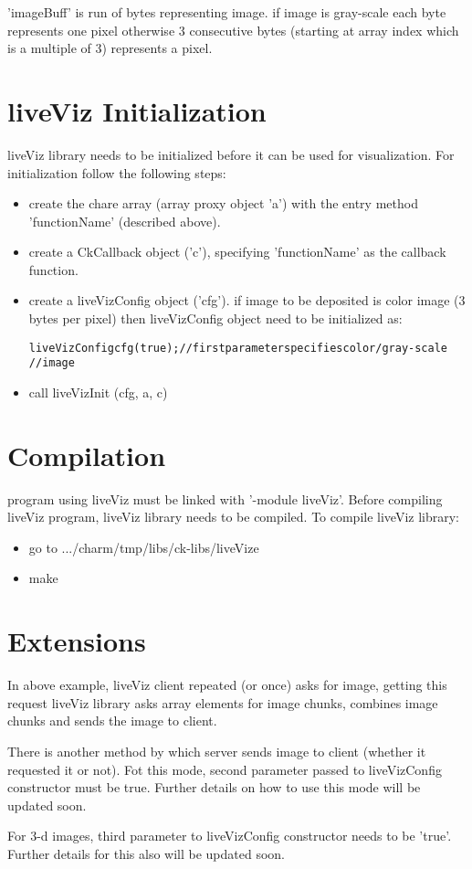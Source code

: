 'imageBuff' is run of bytes representing image. if image is gray-scale each
 byte represents one pixel otherwise 3 consecutive bytes (starting at 
array index which is a multiple of 3) represents a pixel.

\section{liveViz Initialization}

liveViz library needs to be initialized before it can be used for 
visualization. For initialization follow the following steps:
\begin{itemize}
\item create the chare array (array proxy object 'a') with the entry 
      method 'functionName' (described above).
\item create a CkCallback object ('c'), specifying 'functionName' as the 
      callback function.
\item create a liveVizConfig object ('cfg'). if image to be deposited is color 
      image (3 bytes per pixel) then liveVizConfig object need to be initialized
      as:
\begin{alltt}
          liveVizConfig cfg (true);// first parameter specifies color/gray-scale
                                   // image
\end{alltt}

\item call liveVizInit (cfg, a, c)
\end{itemize}

\section{Compilation}

\charmpp{} program using liveViz must be linked with '-module liveViz'. Before
compiling liveViz program, liveViz library needs to be compiled. To compile
liveViz library:
\begin{itemize}
\item go to .../charm/tmp/libs/ck-libs/liveVize
\item make
\end{itemize}

\section{Extensions}

In above example, liveViz client repeated (or once) asks for image, getting
this request liveViz library asks array elements for image chunks, combines
image chunks and sends the image to client.

There is another method by which server sends image to client (whether it
requested it or not). Fot this mode, second parameter passed to liveVizConfig
constructor must be true. Further details on how to use this mode will be
updated soon.

For 3-d images, third parameter to liveVizConfig constructor needs to be
'true'. Further details for this also will be updated soon. 
